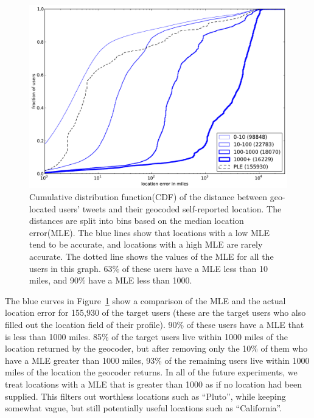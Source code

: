 \begin{figure}[tb]
\centering
\includegraphics[width=\linewidth]{figures/mloc_mdist.pdf}
\caption{
Cumulative distribution function(CDF) of the distance between geo-located
users' tweets and their geocoded self-reported location.
%
The distances are split into bins based on the median location error(MLE).
%
The blue lines show that locations with a low MLE tend to be accurate, and
locations with a high MLE are rarely accurate.
%
The dotted line shows the values of the MLE for all the
users in this graph.
%
63\% of these users have a MLE less than 10 miles, and 90\% have a MLE
less than 1000.
}
\label{fig:DiffMlocMdist}
\end{figure}

The blue curves in Figure~\ref{fig:DiffMlocMdist} show a comparison of the MLE
and the actual location error for 155,930 of the target users (these are the
target users who also filled out the location field of their profile).
%
90\% of these users have a MLE that is less than 1000 miles.
%
85\% of the target users live within 1000 miles of the location returned by
the geocoder, but after removing only the 10\% of them who have a MLE greater
than 1000 miles, 93\% of the remaining users live within 1000 miles of the
location the geocoder returns.
%
In all of the future experiments, we treat locations with a MLE that is greater
than 1000 as if no location had been supplied.
%
This filters out worthless locations such as ``Pluto'', while keeping somewhat
vague, but still potentially useful locations such as ``California''.
